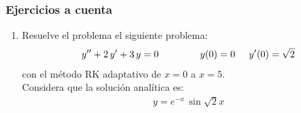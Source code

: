 \documentclass[12pt]{beamer}
\begin{document}
\begin{frame}
\frametitle{Ejercicios a cuenta}
\begin{enumerate}
\conti
\item Resuelve el problema el siguiente problema:
\begin{align*}
{y}^{\prime \prime} + 2 \, {y}^{\prime} + 3 \, y = 0 \hspace{1.5cm} y (0) = 0 \hspace{0.5cm} {y}^{\prime} (0) = \sqrt{2}
\end{align*}
con el método RK adaptativo de $x = 0$ a $x = 5$.
\\
Considera que la solución analítica es:
\begin{align*}
y = e^{-x} \, \sin \sqrt{2} x
\end{align*}
\seti
\end{enumerate}
\end{frame}

\end{document}
